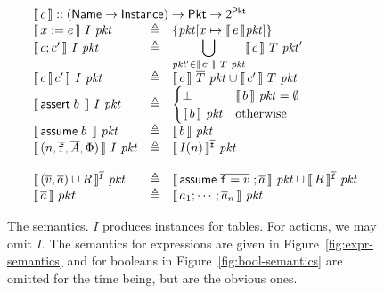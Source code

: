 \begin{figure}
  \[\begin{array}{lcl}
      \multicolumn 3 l {\bracbb{c}:: (\Name \to \Instance) \to \Pkt \to 2^\Pkt}\\
      \bracbb{x:=e}~I~\pkt &\triangleq& \{\pkt[x \mapsto \bracbb{e} \pkt]\} \\
      \bracbb{c;c'}~I~\pkt & \triangleq& \displaystyle \bigcup_{\pkt' \in \bracbb{c'}~T~\pkt}\bracbb{c}~T~\pkt' \\
      \bracbb{c\angel c'}~I~\pkt & \triangleq & \bracbb{c}~\vec T~\pkt \cup \bracbb{c'}~T~\pkt\\
      \bracbb{\assert b}~I~\pkt & \triangleq & \begin{cases}
        \bot & \bracbb{b}~\pkt = \emptyset \\
        \bracbb{b}~\pkt & \textrm{otherwise}
      \end{cases} \\
      \bracbb{\assume b}~\pkt & \triangleq &\bracbb{b}~\pkt\\
      \bracbb{(n,\vec{\var f}, \vec A, \Phi)}~I~\pkt &\triangleq & \bracbb{I(n)}^{\vec{\var f}}~\pkt \\\\
      \bracbb{(\vec v, \vec a)\cup R}^{\vec{\var f}}~\pkt & \triangleq &
                                                                         \bracbb{\assume{\vec{\var f = v}}; \vec a}~\pkt \cup \bracbb{R}^{\vec{\var f}}~\pkt \\
      \bracbb{\vec a}~pkt & \triangleq & \bracbb{a_1;\cdots;\vec a_n}~\pkt\\
    \end{array}
  \]

  \caption{The semantics. $I$ produces instances for tables. For
    actions, we may omit $I$. The semantics for expressions are given
    in Figure~\ref{fig:expr-semantics} and for booleans in
    Figure~\ref{fig:bool-semantics} are omitted for the time being,
    but are the obvious ones.}
  \label{fig:semantics}
\end{figure}


